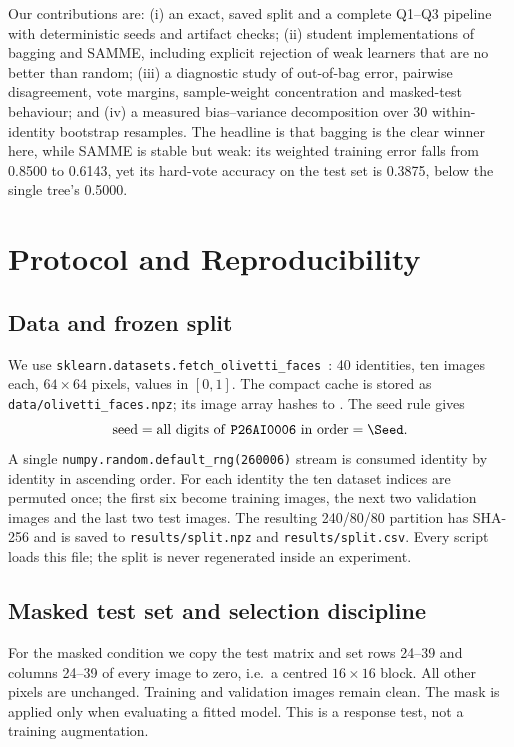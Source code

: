 \documentclass[10pt,twocolumn,letterpaper]{article}
\begin{document}
Our contributions are: (i) an exact, saved split and a complete Q1--Q3
pipeline with deterministic seeds and artifact checks; (ii) student
implementations of bagging and SAMME, including explicit rejection of weak
learners that are no better than random; (iii) a diagnostic study of out-of-bag
error, pairwise disagreement, vote margins, sample-weight concentration and
masked-test behaviour; and (iv) a measured bias--variance decomposition over 30
within-identity bootstrap resamples.  The headline is that bagging is the clear
winner here, while SAMME is stable but weak: its weighted training error falls
from 0.8500 to 0.6143, yet its hard-vote accuracy on the test set is 0.3875,
below the single tree's 0.5000.

\section{Protocol and Reproducibility}

\subsection{Data and frozen split}

We use \texttt{sklearn.datasets.fetch\_olivetti\_faces}~\cite{samaria1994}: 40
identities, ten images each, $64\times64$ pixels, values in $[0,1]$.  The compact cache is
stored as \texttt{data/olivetti\_faces.npz}; its image array hashes to
\texttt{\DataHash}.  The seed rule gives
\begin{equation}
\text{seed} = \text{all digits of \texttt{P26AI0006} in order} = \Seed.
\end{equation}
A single \texttt{numpy.random.default\_rng(260006)} stream is consumed identity
by identity in ascending order.  For each identity the ten dataset indices are
permuted once; the first six become training images, the next two validation
images and the last two test images.  The resulting 240/80/80 partition has
SHA-256 \texttt{\SplitHash} and is saved to \texttt{results/split.npz} and
\texttt{results/split.csv}.  Every script loads this file; the split is never
regenerated inside an experiment.

\subsection{Masked test set and selection discipline}

For the masked condition we copy the test matrix and set rows 24--39 and
columns 24--39 of every image to zero, i.e.\ a centred $16\times16$ block.  All
other pixels are unchanged.  Training and validation images remain clean.  The
mask is applied only when evaluating a fitted model.  This is a response test,
not a training augmentation.
\end{document}

